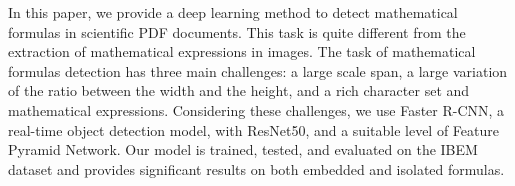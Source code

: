 In this paper, we provide a deep learning method to detect mathematical formulas in scientific PDF documents. This task is quite different from the extraction of mathematical expressions in images. The task of mathematical formulas detection has three main challenges: a large scale span, a large variation of the ratio between the width and the height, and a rich character set and mathematical expressions. Considering these challenges, we use Faster R-CNN, a real-time object detection model, with ResNet50, and a suitable level of Feature Pyramid Network. Our model is trained, tested, and evaluated on the IBEM dataset and provides significant results on both embedded and isolated formulas.